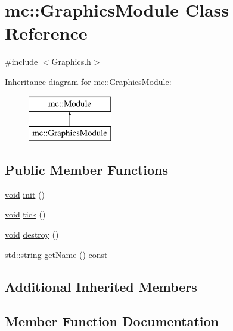 \hypertarget{classmc_1_1_graphics_module}{}\section{mc\+:\+:Graphics\+Module Class Reference}
\label{classmc_1_1_graphics_module}


{\ttfamily \#include $<$Graphics.\+h$>$}

Inheritance diagram for mc\+:\+:Graphics\+Module\+:\begin{figure}[H]
\begin{center}
\leavevmode
\includegraphics[height=2.000000cm]{classmc_1_1_graphics_module}
\end{center}
\end{figure}
\subsection*{Public Member Functions}
\begin{DoxyCompactItemize}
\item 
\hyperlink{_s_d_l__opengles2__gl2ext_8h_ae5d8fa23ad07c48bb609509eae494c95}{void} \hyperlink{classmc_1_1_graphics_module_aa25a958db86ea6930fb4c7d0d98dc1ab}{init} ()
\item 
\hyperlink{_s_d_l__opengles2__gl2ext_8h_ae5d8fa23ad07c48bb609509eae494c95}{void} \hyperlink{classmc_1_1_graphics_module_a80293bd6706490288419bb359ee544a6}{tick} ()
\item 
\hyperlink{_s_d_l__opengles2__gl2ext_8h_ae5d8fa23ad07c48bb609509eae494c95}{void} \hyperlink{classmc_1_1_graphics_module_af03308d7f2b29600d667077fa0370672}{destroy} ()
\item 
\hyperlink{_s_d_l__opengl__glext_8h_ae84541b4f3d8e1ea24ec0f466a8c568b}{std\+::string} \hyperlink{classmc_1_1_graphics_module_a3ff79450c20afe48690200d228fb380b}{get\+Name} () const 
\end{DoxyCompactItemize}
\subsection*{Additional Inherited Members}


\subsection{Member Function Documentation}
